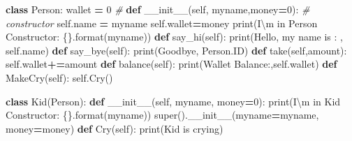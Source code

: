 \documentclass[
]{book}
\newenvironment{Shaded}{\begin{snugshade}}{\end{snugshade}}
\newcommand{\BuiltInTok}[1]{#1}
\newcommand{\CharTok}[1]{\textcolor[rgb]{0.5,0.5,0.5}{#1}}
\newcommand{\CommentTok}[1]{\textcolor[rgb]{0.37,0.37,0.37}{\textit{#1}}}
\newcommand{\DecValTok}[1]{\textcolor[rgb]{0.06,0.06,0.06}{#1}}
\newcommand{\FunctionTok}[1]{\textcolor[rgb]{0,0,0}{#1}}
\newcommand{\KeywordTok}[1]{\textcolor[rgb]{0.27,0.27,0.27}{\textbf{#1}}}
\newcommand{\NormalTok}[1]{#1}
\newcommand{\OperatorTok}[1]{\textcolor[rgb]{0.43,0.43,0.43}{\textbf{#1}}}
\newcommand{\SpecialCharTok}[1]{\textcolor[rgb]{0,0,0}{#1}}
\newcommand{\StringTok}[1]{\textcolor[rgb]{0.5,0.5,0.5}{#1}}
\newcommand{\VariableTok}[1]{\textcolor[rgb]{0,0,0}{#1}}
\begin{document}
\begin{Shaded}
\begin{Highlighting}[]
\KeywordTok{class}\NormalTok{ Person:}
\NormalTok{  wallet }\OperatorTok{=} \DecValTok{0}  \CommentTok{\# }
  \KeywordTok{def} \FunctionTok{\_\_init\_\_}\NormalTok{(}\VariableTok{self}\NormalTok{, myname,money}\OperatorTok{=}\DecValTok{0}\NormalTok{):   }\CommentTok{\# constructor}
      \VariableTok{self}\NormalTok{.name }\OperatorTok{=}\NormalTok{ myname}
      \VariableTok{self}\NormalTok{.wallet}\OperatorTok{=}\NormalTok{money}
      \BuiltInTok{print}\NormalTok{(}\StringTok{\textquotesingle{}I}\CharTok{\textbackslash{}\textquotesingle{}}\StringTok{m in Person Constructor: }\SpecialCharTok{\{\}}\StringTok{\textquotesingle{}}\NormalTok{.}\BuiltInTok{format}\NormalTok{(myname))}
  \KeywordTok{def}\NormalTok{ say\_hi(}\VariableTok{self}\NormalTok{):}
      \BuiltInTok{print}\NormalTok{(}\StringTok{\textquotesingle{}Hello, my name is : \textquotesingle{}}\NormalTok{, }\VariableTok{self}\NormalTok{.name)}
  \KeywordTok{def}\NormalTok{ say\_bye(}\VariableTok{self}\NormalTok{):}
      \BuiltInTok{print}\NormalTok{(}\StringTok{\textquotesingle{}Goodbye\textquotesingle{}}\NormalTok{, Person.ID)}
  \KeywordTok{def}\NormalTok{ take(}\VariableTok{self}\NormalTok{,amount):}
      \VariableTok{self}\NormalTok{.wallet}\OperatorTok{+=}\NormalTok{amount}
  \KeywordTok{def}\NormalTok{ balance(}\VariableTok{self}\NormalTok{):}
      \BuiltInTok{print}\NormalTok{(}\StringTok{\textquotesingle{}Wallet Balance:\textquotesingle{}}\NormalTok{,}\VariableTok{self}\NormalTok{.wallet)}
  \KeywordTok{def}\NormalTok{ MakeCry(}\VariableTok{self}\NormalTok{):}
      \VariableTok{self}\NormalTok{.Cry()}
      
\KeywordTok{class}\NormalTok{ Kid(Person):}
  \KeywordTok{def} \FunctionTok{\_\_init\_\_}\NormalTok{(}\VariableTok{self}\NormalTok{, myname, money}\OperatorTok{=}\DecValTok{0}\NormalTok{):}
      \BuiltInTok{print}\NormalTok{(}\StringTok{\textquotesingle{}I}\CharTok{\textbackslash{}\textquotesingle{}}\StringTok{m in Kid Constructor: }\SpecialCharTok{\{\}}\StringTok{\textquotesingle{}}\NormalTok{.}\BuiltInTok{format}\NormalTok{(myname))}
      \BuiltInTok{super}\NormalTok{().}\FunctionTok{\_\_init\_\_}\NormalTok{(myname}\OperatorTok{=}\NormalTok{myname, money}\OperatorTok{=}\NormalTok{money)}
  \KeywordTok{def}\NormalTok{ Cry(}\VariableTok{self}\NormalTok{):}
      \BuiltInTok{print}\NormalTok{(}\StringTok{\textquotesingle{}Kid is crying\textquotesingle{}}\NormalTok{)}
\end{Highlighting}
\end{Shaded}
\end{document}
